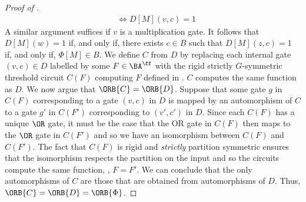 \documentclass{toc}
\begin{document}
\begin{proof}[Proof of ]
\begin{align*}
                   &\iff D[M](v, c) = 1 
  \end{align*}
  A similar argument suffices if $v$ is a multiplication gate. It follows that
  $D[M](w) = 1$ if, and only if, there exists $c \in B$ such that $D[M](z, c) =
  1$ if, and only if, $\Phi[M] \in B$.
  We define $C$ from $D$ by replacing each internal gate $(v, c) \in D$ labelled
  by some $F \in \BA^{\ff}$ with the rigid strictly $G$-symmetric threshold
  circuit $C(F)$ computing $F$ defined in .
  $C$ computes the same function as $D$.  We now argue that $\ORB{C}
  = \ORB{D}$.  Suppose that some gate $g$ in $C(F)$ corresponding to a
  gate $(v,c)$ in $D$ is mapped by an automorphism of $C$ to a gate
  $g'$ in $C(F')$ corresponding to $(v',c')$ in $D$.  Since each
  $C(F)$ has a unique $\OR$ gate, it must be the case that the OR gate in
  $C(F)$ then maps to the $\OR$ gate in $C(F')$ and so we have an
  isomorphism between $C(F)$ and $C(F')$.  The fact that  $C(F)$ is
  rigid and  \emph{strictly} partition
  symmetric ensures that the isomorphism respects the partition on the
  input and so the circuits compute the same function, \ie, $F = F'$.
  We can conclude that the only
  automorphisms of $C$ are those that are obtained from automorphisms
  of $D$.  Thus, $\ORB{C} = \ORB{D} = \ORB{\Phi}$.
\end{proof}
      
\end{document}

